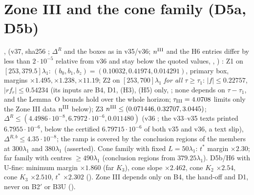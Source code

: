 \documentclass[11pt]{article}
\begin{document}
\section{Zone III and the cone family (D5a, D5b)}\label{M:sec:zone3}
,  (v37, sha256 ; $\Delta^R$ and the boxes as in v35/v36; $n^{\rm III}$ and the H6 entries differ by less than $2\cdot10^{-5}$ relative from v36 and stay below the quoted values, , ) \tC: Z1 on $[253,379.5]\lambda_1$: $(b_0,b_1,b_z)=(0.10032,0.41974,0.014291)$, primary box, margins $\times1.495,\times1.238,\times11.19$; Z2 on $[253,700]\lambda_1$ \emph{for all $\tau\ge\tau_1$}: $|f|\le0.22757$, $|rf_r|\le0.54234$ (its inputs are B4, D1, (H3), (H5) only, ; none depends on $\tau-\tau_1$, and the Lemma~O bounds hold over the whole horizon; $\tau_{\rm III}=4.0708$ limits only the Zone III data $n^{\rm III}$ below); Z3 $n^{\rm III}\le(0.071446,0.32707,3.0445)$; $\Delta^R\le(4.4986\cdot10^{-8},6.7972\cdot10^{-6},0.011480)$ (v36 ; the v33--v35 texts printed $6.7955\cdot10^{-6}$, below the certified $6.79715\cdot10^{-6}$ of both v35 and v36, a text slip), $\Delta^{R,b}\le4.35\cdot10^{-8}$; the ramp is covered by the conclusion regions of the members at $300\lambda_1$ and $380\lambda_1$ (asserted). Cone family with fixed $L=50\lambda_1$: $t^*$ margin $\times2.30$; far family with centres $\ge490\lambda_1$ (conclusion regions from $379.25\lambda_1$). D5b/H6 with U-fine: minimum margin $\times1.860$ (far $K_3$), cone slope $\times2.462$, cone $K_2$ $\times2.54$, cone $K_3$ $\times2.510$, $t^*$ $\times2.302$ (). Zone III depends only on B4, the hand-off and D1, never on B2$'$ or B3U ().


\end{document}
